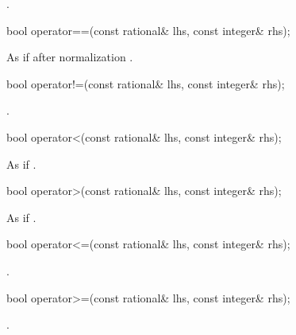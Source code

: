 \begin{itemdescr}
\returns {}.
\end{itemdescr}

\begin{itemdecl}
bool operator==(const rational& lhs, const integer& rhs);
\end{itemdecl}

\begin{itemdescr}
\returns As if after normalization .
\end{itemdescr}

\begin{itemdecl}
bool operator!=(const rational& lhs, const integer& rhs);
\end{itemdecl}

\begin{itemdescr}
\returns {}.
\end{itemdescr}

\begin{itemdecl}
bool operator<(const rational& lhs, const integer& rhs);
\end{itemdecl}

\begin{itemdescr}
\returns As if .
\end{itemdescr}

\begin{itemdecl}
bool operator>(const rational& lhs, const integer& rhs);
\end{itemdecl}

\begin{itemdescr}
\returns As if .
\end{itemdescr}

\begin{itemdecl}
bool operator<=(const rational& lhs, const integer& rhs);
\end{itemdecl}

\begin{itemdescr}
\returns {}.
\end{itemdescr}

\begin{itemdecl}
bool operator>=(const rational& lhs, const integer& rhs);
\end{itemdecl}

\begin{itemdescr}
\returns {}.
\end{itemdescr}

